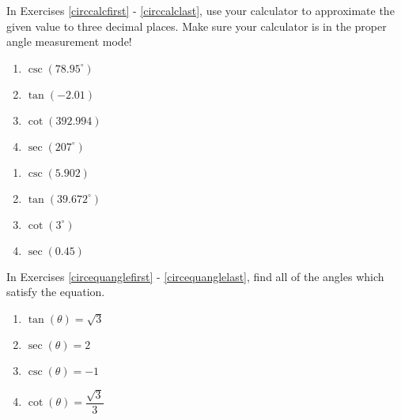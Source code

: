 \pagebreak

In Exercises \ref{circcalcfirst} - \ref{circcalclast}, use your calculator to approximate the given value to three decimal places.  Make sure your calculator is in the proper angle measurement mode!

\begin{multicols}{4}

\begin{enumerate}

\setcounter{enumi}{\value{HW}}

\item $\csc(78.95^{\circ})$ \label{circcalcfirst}
\item $\tan(-2.01)$
\item $\cot(392.994)$
\item $\sec(207^{\circ})$

\setcounter{HW}{\value{enumi}}

\end{enumerate}

\end{multicols}

\begin{multicols}{4}

\begin{enumerate}

\setcounter{enumi}{\value{HW}}

\item $\csc(5.902)$
\item $\tan(39.672^{\circ})$
\item $\cot(3^{\circ})$
\item $\sec(0.45)$ \label{circcalclast}

\setcounter{HW}{\value{enumi}}

\end{enumerate}

\end{multicols}


In Exercises \ref{circequanglefirst} - \ref{circequanglelast}, find all of the angles which satisfy the equation.

\begin{multicols}{4}

\begin{enumerate}

\setcounter{enumi}{\value{HW}}

\item $\tan(\theta) = \sqrt{3}$  \label{circequanglefirst}
\item $\sec(\theta) = 2$ 
\item $\csc(\theta) = -1$ 
\item $\cot(\theta) = \dfrac{\sqrt{3}}{3}$

\setcounter{HW}{\value{enumi}}

\end{enumerate}

\end{multicols}

